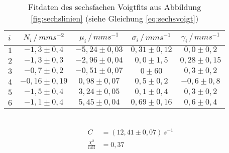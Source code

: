 \begin{table}[h!]
	\centering
	\begin{tabular}{l|cccc}
		$i$&$N_i\,/\,\si{mms^{-2}}$&$\mu_i\,/\,\si{mms^{-1}}$&$\sigma_i\,/\,\si{mms^{-1}}$&$\gamma_i\,/\,\si{mms^{-1}}$\\\hline
		$1$&$-1,3\pm0,4$&$-5,24\pm0,03$&$0,31 \pm0,12$&$0,0 \pm0,2$\\
		$2$&$-1,3\pm0,3$&$-2,96\pm0,04$&$0,0  \pm1,5$ &$0,28\pm0,15$\\
		$3$&$-0,7\pm0,2$&$-0,51\pm0,07$&$0    \pm60$  &$0,3 \pm0,2$\\
		$4$&$-0,16\pm0,19$&$ 0,98\pm0,07$&$0,5\pm0,2$ &$-0,6\pm0,8$\\
		$5$&$-1,5\pm0,4$&$ 3,24\pm0,05$&$0,1  \pm0,4$ &$0,3 \pm0,2$\\
		$6$&$-1,1\pm0,4$&$ 5,45\pm0,04$&$0,69 \pm0,16$&$0,6\pm0,4$\\
	\end{tabular}\\
	\begin{align*}
		C&=(12,41\pm0,07)\,\si{s^{-1}}\\
		\frac{\chi^2}{\mathrm{ndf}}&=0,37
	\end{align*}
	\caption{Fitdaten des sechsfachen Voigtfits aus Abbildung \ref{fig:sechslinien} (siehe Gleichung \ref{eq:sechsvoigt})}
	\label{tab:sechsvoigt}
\end{table}